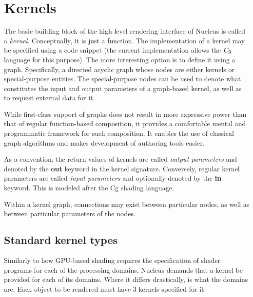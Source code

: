 \section{Kernels}
\label{sec:Kernels}

The basic building block of the high level rendering interface of Nucleus is called a \emph{kernel}. Conceptually, it is just a function. The implementation of a kernel may be specified using a code snippet (the current implementation allows the \emph{Cg} language for this purpose). The more interesting option is to define it using a graph. Specifically, a directed acyclic graph whose nodes are either kernels or special-purpose entities. The special-purpose nodes can be used to denote what constitutes the input and output parameters of a graph-based kernel, as well as to request external data for it.

While first-class support of graphs does not result in more expressive power than that of regular function-based composition, it provides a comfortable mental and programmatic framework for such composition. It enables the use of classical graph algorithms and makes development of authoring tools easier.

As a convention, the return values of kernels are called \emph{output parameters} and denoted by the \textbf{out} keyword in the kernel signature. Conversely, regular kernel parameters are called \emph{input parameters} and optionally denoted by the \textbf{in} keyword. This is modeled after the Cg shading language.

Within a kernel graph, connections may exist between particular nodes, as well as between particular parameters of the nodes.

\subsection{Standard kernel types}

Similarly to how GPU-based shading requires the specification of shader programs for each of the processing domains, Nucleus demands that a kernel be provided for each of its domains. Where it differs drastically, is what the domains are. Each object to be rendered must have 3 kernels specified for it:

